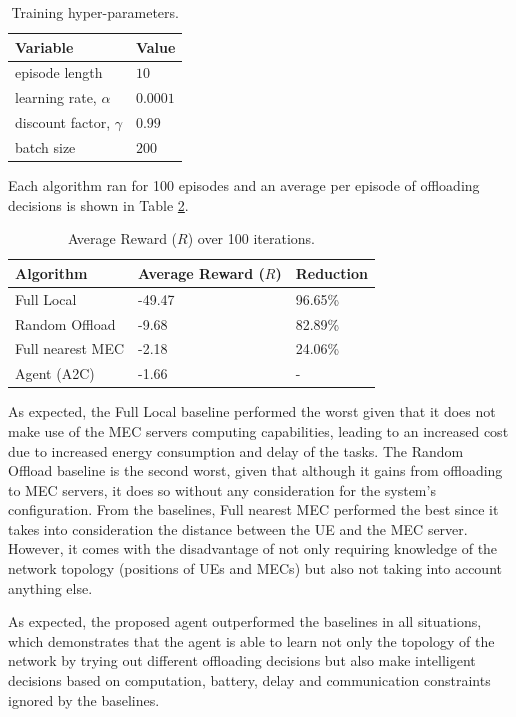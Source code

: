 \begin{table}[H]
\centering
\begin{tabular}{|l|l|}
\hline
Variable & Value \\ \hline
episode length&$10$\\
learning rate, $\alpha$&$0.0001$\\
discount factor, $\gamma$&$0.99$\\
batch size&$200$\\ \hline
\end{tabular}
\caption{Training hyper-parameters.}\label{training_hyperparams}
\end{table}

Each algorithm ran for 100 episodes and an average per episode of offloading decisions is shown in Table \ref{resultstest1}.

\begin{table}[H]
\centering
\begin{tabular}{|l|l|l|}
\hline
Algorithm        & Average Reward ($R$) & Reduction\\ \hline
Full Local       & -49.47 & 96.65\%\\
Random Offload   & -9.68 & 82.89\%\\
Full nearest MEC & -2.18 & 24.06\%\\ 
Agent (A2C) & -1.66 & -\\ \hline
\end{tabular}
\caption{Average Reward ($R$) over 100 iterations.} \label{resultstest1}
\end{table}

As expected, the Full Local baseline performed the worst given that it does not make use of the \acrshort{MEC} servers computing capabilities, leading to an increased cost due to increased energy consumption and delay of the tasks. The Random Offload baseline is the second worst, given that although it gains from offloading to \acrshort{MEC} servers, it does so without any consideration for the system's configuration. From the baselines, Full nearest MEC performed the best since it takes into consideration the distance between the \acrshort{UE} and the \acrshort{MEC} server. However, it comes with the disadvantage of not only requiring knowledge of the network topology (positions of \acrshort{UE}s and \acrshort{MEC}s) but also not taking into account anything else. 

As expected, the proposed agent outperformed the baselines in all situations, which demonstrates that the agent is able to learn not only the topology of the network by trying out different offloading decisions but also make intelligent decisions based on computation, battery, delay and communication constraints ignored by the baselines.

